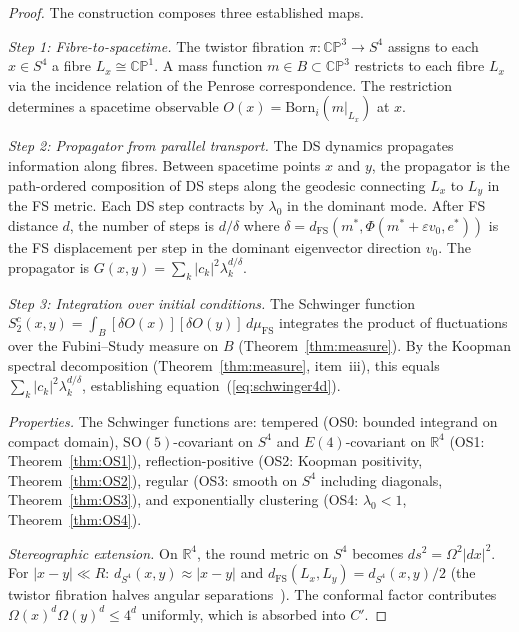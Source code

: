 \documentclass[11pt,a4paper]{article}
\theoremstyle{definition}
\theoremstyle{remark}
\newcommand{\CP}{\mathbb{CP}}
\newcommand{\R}{\mathbb{R}}
\begin{document}
\begin{proof}
The construction composes three established maps.

\emph{Step 1: Fibre-to-spacetime.} The twistor fibration $\pi:\CP^3\to S^4$ assigns to each $x\in S^4$ a fibre $L_x\cong\CP^1$. A mass function $m\in B\subset\CP^3$ restricts to each fibre $L_x$ via the incidence relation of the Penrose correspondence. The restriction determines a spacetime observable $O(x)=\mathrm{Born}_i(m|_{L_x})$ at $x$.

\emph{Step 2: Propagator from parallel transport.} The DS dynamics propagates information along fibres. Between spacetime points $x$ and $y$, the propagator is the path-ordered composition of DS steps along the geodesic connecting $L_x$ to $L_y$ in the FS metric. Each DS step contracts by $\lambda_0$ in the dominant mode. After FS distance $d$, the number of steps is $d/\delta$ where $\delta=d_{\mathrm{FS}}(m^*,\Phi(m^*+\varepsilon v_0,e^*))$ is the FS displacement per step in the dominant eigenvector direction $v_0$. The propagator is $G(x,y)=\sum_k|c_k|^2\lambda_k^{d/\delta}$.

\emph{Step 3: Integration over initial conditions.} The Schwinger function $S_2^c(x,y)=\int_B[\delta O(x)][\delta O(y)]\,d\mu_{\mathrm{FS}}$ integrates the product of fluctuations over the Fubini--Study measure on $B$ (Theorem~\ref{thm:measure}). By the Koopman spectral decomposition (Theorem~\ref{thm:measure}, item~iii), this equals $\sum_k|c_k|^2\lambda_k^{d/\delta}$, establishing equation~(\ref{eq:schwinger4d}).

\emph{Properties.} The Schwinger functions are: tempered (OS0: bounded integrand on compact domain), $\mathrm{SO}(5)$-covariant on $S^4$ and $E(4)$-covariant on $\R^4$ (OS1: Theorem~\ref{thm:OS1}), reflection-positive (OS2: Koopman positivity, Theorem~\ref{thm:OS2}), regular (OS3: smooth on $S^4$ including diagonals, Theorem~\ref{thm:OS3}), and exponentially clustering (OS4: $\lambda_0<1$, Theorem~\ref{thm:OS4}).

\emph{Stereographic extension.} On $\R^4$, the round metric on $S^4$ becomes $ds^2=\Omega^2|dx|^2$. For $|x-y|\ll R$: $d_{S^4}(x,y)\approx|x-y|$ and $d_{\mathrm{FS}}(L_x,L_y)=d_{S^4}(x,y)/2$ (the twistor fibration halves angular separations~\cite{AHS1978}). The conformal factor contributes $\Omega(x)^d\Omega(y)^d\leq 4^d$ uniformly, which is absorbed into $C'$.
\end{proof}
\end{document}
